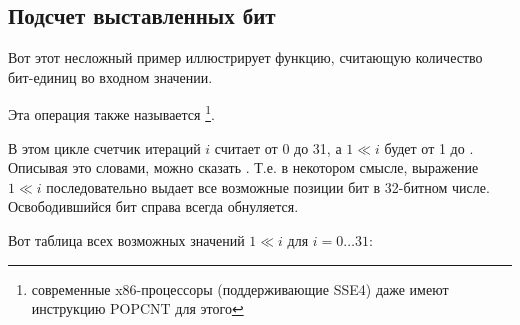 ﻿\subsection{Подсчет выставленных бит}

Вот этот несложный пример иллюстрирует функцию, считающую количество бит-единиц во входном значении.

Эта операция также называется \footnote{современные x86-процессоры (поддерживающие SSE4) даже имеют инструкцию POPCNT для этого}.



В этом цикле счетчик итераций $i$ считает от 0 до 31, а $1 \ll i$ будет от 1 до . 
Описывая это словами, можно сказать 
.
Т.е. в некотором смысле, выражение $1 \ll i$ последовательно выдает все возможные позиции бит в 32-битном числе. 
Освободившийся бит справа всегда обнуляется.

Вот таблица всех возможных значений $1 \ll i$ для $i=0 \ldots 31$:

